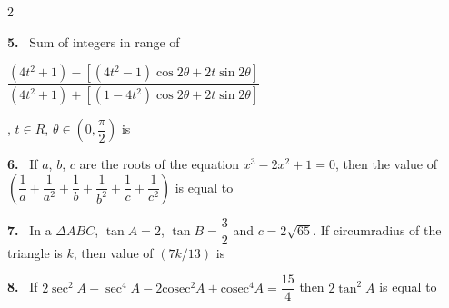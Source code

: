 \documentclass[10pt]{extarticle}
\newcommand{\qn}[1]{\par\smallskip\noindent\textbf{#1.}~}
\begin{document}
\begin{multicols}{2}
\qn{5} Sum of integers in range of
\par\noindent\hfill{\footnotesize$\dfrac{(4t^2+1)-\left[(4t^2-1)\cos2\theta+2t\sin2\theta\right]}{(4t^2+1)+\left[(1-4t^2)\cos2\theta+2t\sin2\theta\right]}$}\hfill\null\par
, $t\in R$, $\theta\in\left(0,\dfrac\pi2\right)$ is
\qn{6} If $a$, $b$, $c$ are the roots of the equation $x^3-2x^2+1=0$, then the value of $\left(\dfrac1a+\dfrac1{a^2}+\dfrac1b+\dfrac1{b^2}+\dfrac1c+\dfrac1{c^2}\right)$ is equal to
\qn{7} In a $\Delta ABC$, $\tan A=2$, $\tan B=\dfrac32$ and $c=2\sqrt{65}$. If circumradius of the triangle is $k$, then value of $(7k/13)$ is
\qn{8} If $2\sec^2A-\sec^4A-2\mathrm{cosec}^2A+\mathrm{cosec}^4A=\dfrac{15}4$ then $2\tan^2A$ is equal to
\end{multicols}
\end{document}
